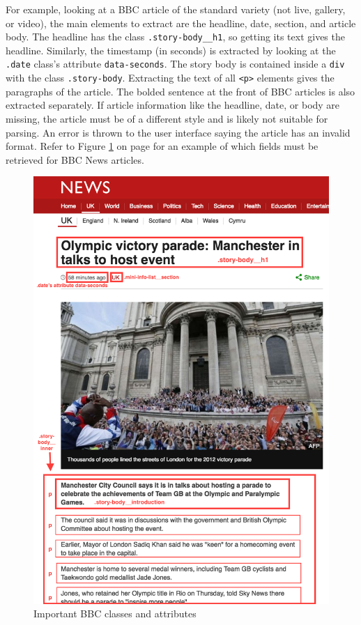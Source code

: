 \documentclass[11pt,titlepage]{report}
\begin{document}
For example, looking at a BBC article of the standard variety (not live, gallery, or video), the main elements to extract are the headline, date, section, and article body. The headline has the class \lstinline|.story-body__h1|, so getting its text gives the headline. Similarly, the timestamp (in seconds) is extracted by looking at the \lstinline|.date| class's attribute \lstinline|data-seconds|. The story body is contained inside a \lstinline|div| with the class \lstinline|.story-body|. Extracting the text of all \lstinline|<p>| elements gives the paragraphs of the article. The bolded sentence at the front of BBC articles is also extracted separately. If article information like the headline, date, or body are missing, the article must be of a different style and is likely not suitable for parsing. An error is thrown to the user interface saying the article has an invalid format. Refer to Figure \ref{fig:bbcArticle} on page \pageref{fig:bbcArticle} for an example of which fields must be retrieved for BBC News articles.

\begin{figure}
	\centering
	\includegraphics[scale=.9]{img/bbcArticle.png}
	\caption{Important BBC classes and attributes\label{fig:bbcArticle}}
\end{figure}
\end{document}
